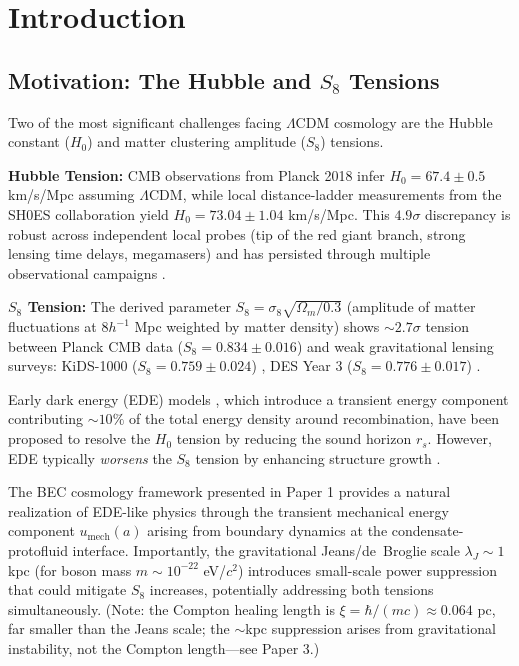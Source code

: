 \documentclass[11pt,a4paper]{article}
\newcommand{\umech}{\ensuremath{u_{\mathrm{mech}}}}
\newcommand{\rs}{\ensuremath{r_s}}
\newcommand{\Omm}{\ensuremath{\Omega_m}}
\theoremstyle{definition}
\theoremstyle{remark}
\begin{document}
\tableofcontents
\newpage

\section{Introduction}
\label{sec:introduction}

\subsection{Motivation: The Hubble and $S_8$ Tensions}
\label{sec:motivation}

Two of the most significant challenges facing $\Lambda$CDM cosmology are the Hubble constant ($H_0$) and matter clustering amplitude ($S_8$) tensions.

\textbf{Hubble Tension:} CMB observations from Planck 2018 \cite{Planck2018} infer $H_0 = 67.4 \pm 0.5$ km/s/Mpc assuming $\Lambda$CDM, while local distance-ladder measurements from the SH0ES collaboration \cite{Riess2022} yield $H_0 = 73.04 \pm 1.04$ km/s/Mpc. This $4.9\sigma$ discrepancy is robust across independent local probes (tip of the red giant branch, strong lensing time delays, megamasers) and has persisted through multiple observational campaigns \cite{Freedman2021,Verde2019,DiValentino2021}.

\textbf{$S_8$ Tension:} The derived parameter $S_8 = \sigma_8 \sqrt{\Omm/0.3}$ (amplitude of matter fluctuations at $8h^{-1}$ Mpc weighted by matter density) shows $\sim 2.7\sigma$ tension between Planck CMB data ($S_8 = 0.834 \pm 0.016$) and weak gravitational lensing surveys: KiDS-1000 ($S_8 = 0.759 \pm 0.024$) \cite{KiDS2021}, DES Year 3 ($S_8 = 0.776 \pm 0.017$) \cite{DES2022}.

Early dark energy (EDE) models \cite{Poulin2019,Karwal2016,Agrawal2019}, which introduce a transient energy component contributing $\sim 10\%$ of the total energy density around recombination, have been proposed to resolve the $H_0$ tension by reducing the sound horizon $\rs$. However, EDE typically \emph{worsens} the $S_8$ tension by enhancing structure growth \cite{Hill2020}.

The BEC cosmology framework presented in Paper 1 provides a natural realization of EDE-like physics through the transient mechanical energy component $\umech(a)$ arising from boundary dynamics at the condensate-protofluid interface. Importantly, the gravitational Jeans/de~Broglie scale $\lambda_J \sim 1$ kpc (for boson mass $m \sim 10^{-22}$ eV/$c^2$) introduces small-scale power suppression that could mitigate $S_8$ increases, potentially addressing both tensions simultaneously. (Note: the Compton healing length is $\xi = \hbar/(mc) \approx 0.064$ pc, far smaller than the Jeans scale; the $\sim$kpc suppression arises from gravitational instability, not the Compton length---see Paper 3.)
\end{document}
